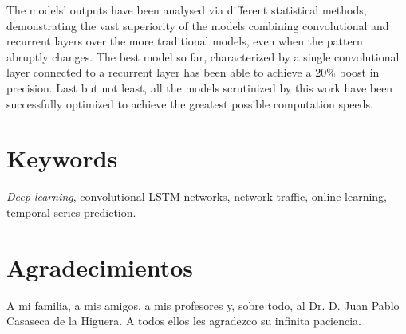 The models' outputs have been analysed via different statistical methods, demonstrating the vast superiority of the models combining convolutional and recurrent layers over the more traditional models, even when the pattern abruptly changes. The best model so far, characterized by a single convolutional layer connected to a recurrent layer has been able to achieve a 20\% boost in precision. Last but not least, all the models scrutinized by this work have been successfully optimized to achieve the greatest possible computation speeds.

\section*{Keywords}
\textit{Deep learning}, convolutional-LSTM networks, network traffic, online learning, temporal series prediction.



\newpage
\section*{Agradecimientos}
A mi familia, a mis amigos, a mis profesores y, sobre todo, al Dr. D. Juan Pablo Casaseca de la Higuera. A todos ellos les agradezco su infinita paciencia.